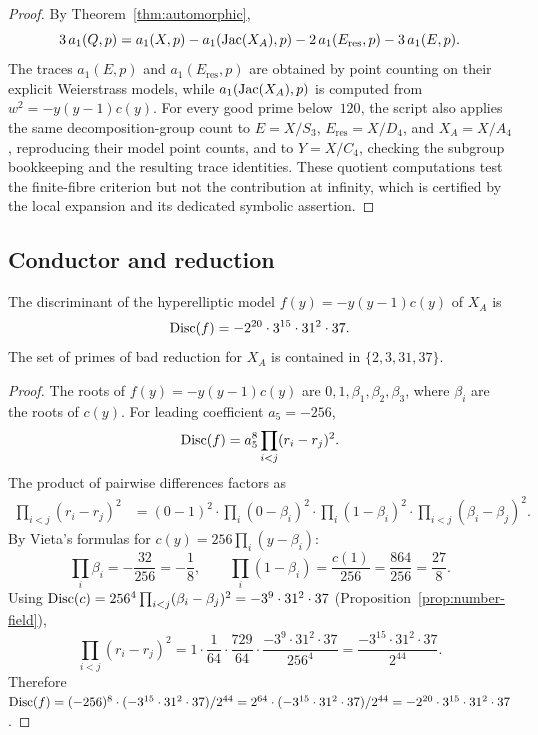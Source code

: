 \begin{proof}
By Theorem~\ref{thm:automorphic},
\[
3\,a_1(Q,p)=a_1(X,p)-a_1(\operatorname{Jac}(X_A),p)-2\,a_1(E_{\mathrm{res}},p)-3\,a_1(E,p).
\]
The traces \(a_1(E,p)\) and \(a_1(E_{\mathrm{res}},p)\) are obtained by point counting on their explicit Weierstrass models, while \(a_1(\operatorname{Jac}(X_A),p)\) is computed from \(w^2=-y(y-1)c(y)\). For every good prime below~\(120\), the script also applies the same decomposition-group count to \(E=X/S_3\), \(E_{\mathrm{res}}=X/D_4\), and \(X_A=X/A_4\), reproducing their model point counts, and to \(Y=X/C_4\), checking the subgroup bookkeeping and the resulting trace identities. These quotient computations test the finite-fibre criterion but not the contribution at infinity, which is certified by the local expansion and its dedicated symbolic assertion.
\end{proof}

\subsection{Conductor and reduction}

\begin{proposition}\label{prop:disc-quintic}
The discriminant of the hyperelliptic model \(f(y)=-y(y-1)c(y)\) of \(X_A\) is
\[
\operatorname{Disc}(f)=-2^{20}\cdot 3^{15}\cdot 31^2\cdot 37.
\]
The set of primes of bad reduction for \(X_A\) is contained in \(\{2,3,31,37\}\).
\end{proposition}

\begin{proof}
The roots of \(f(y)=-y(y-1)c(y)\) are \(0,1,\beta_1,\beta_2,\beta_3\), where \(\beta_i\) are the roots of \(c(y)\). For leading coefficient \(a_5=-256\),
\[
\operatorname{Disc}(f)=a_5^{8}\prod_{i<j}(r_i-r_j)^2.
\]
The product of pairwise differences factors as
\begin{align*}
\prod_{i<j}(r_i-r_j)^2
&=(0-1)^2\cdot\prod_i(0-\beta_i)^2\cdot\prod_i(1-\beta_i)^2\cdot\prod_{i<j}(\beta_i-\beta_j)^2.
\end{align*}
By Vieta's formulas for \(c(y)=256\prod_i(y-\beta_i)\):
\[
\prod_i\beta_i=-\frac{32}{256}=-\frac{1}{8},\qquad
\prod_i(1-\beta_i)=\frac{c(1)}{256}=\frac{864}{256}=\frac{27}{8}.
\]
Using \(\operatorname{Disc}(c)=256^4\prod_{i<j}(\beta_i-\beta_j)^2=-3^9\cdot 31^2\cdot 37\) (Proposition~\ref{prop:number-field}),
\[
\prod_{i<j}(r_i-r_j)^2=1\cdot\frac{1}{64}\cdot\frac{729}{64}\cdot\frac{-3^9\cdot 31^2\cdot 37}{256^4}
=\frac{-3^{15}\cdot 31^2\cdot 37}{2^{44}}.
\]
Therefore \(\operatorname{Disc}(f)=(-256)^8\cdot(-3^{15}\cdot 31^2\cdot 37)/2^{44}=2^{64}\cdot(-3^{15}\cdot 31^2\cdot 37)/2^{44}=-2^{20}\cdot 3^{15}\cdot 31^2\cdot 37\).
\end{proof}

